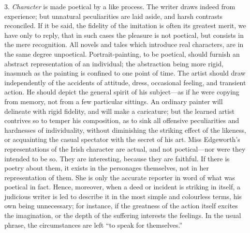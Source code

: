 3. \emph{Character} is made poetical by a like process. The writer
draws indeed from experience; but unnatural peculiarities are laid
aside, and harsh contrasts reconciled. If it be said, the fidelity of
the imitation is often its greatest merit, we have only to reply, that
in such cases the pleasure is not poetical, but consists in the mere
recognition. All novels and tales which introduce real characters, are
in the same degree unpoetical. Portrait-painting, to be poetical,
should furnish an abstract representation of an individual; the
abstraction being more rigid, inasmuch as the painting is confined to
one point of time. The artist should draw independently of the
accidents of attitude, dress, occasional feeling, and transient
action. He should depict the general spirit of his subject—as if he
were copying from memory, not from a few particular sittings. An
ordinary painter will delineate with rigid fidelity, and will make a
caricature; but the learned artist contrives so to temper his
composition, as to sink all offensive peculiarities and hardnesses of
individuality, without diminishing the striking effect of the
likeness, or acquainting the casual spectator with the secret of his
art. Miss Edgeworth's representations of the Irish character are
actual, and not poetical—nor were they intended to be so. They are
interesting, because they are faithful. If there is poetry about them,
it exists in the personages themselves, not in her representation of
them. She is only the accurate reporter in word of what was poetical
in fact. Hence, moreover, when a deed or incident is striking in
itself, a judicious writer is led to describe it in the most simple
and colourless terms, his own being unnecessary; for instance, if the
greatness of the action itself excites the imagination, or the depth
of the suffering interests the feelings. In the usual phrase, the
circumstances are left ``to speak for themselves.''

